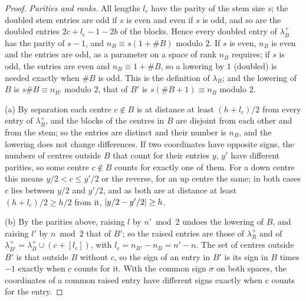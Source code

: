 \begin{proof}
\emph{Parities and ranks.} All lengths $l_c$ have the parity of the stem size $s$; the doubled stem entries are odd if $s$ is even and even if $s$ is odd, and so are the doubled entries $2c+l_c-1-2b$ of the blocks. Hence every doubled entry of $\lambda^+_B$ has the parity of $s-1$, and $n_B\equiv s(1+\#B)$ modulo $2$. If $s$ is even, $n_B$ is
even and the entries are odd, as a parameter on a space of rank $n_B$ requires; if $s$ is odd, the entries are even and $n_B\equiv1+\#B$, so a lowering by $1$ (doubled) is needed exactly when $\#B$ is odd. This is the definition of $\lambda_B$; and the lowering of $B$ is $s\#B\equiv n_{B'}$ modulo $2$, that of $B'$ is $s(\#B+1)\equiv n_B$
modulo $2$.

(a) By separation each centre $c\notin B$ is at distance at least $(h+l_c)/2$ from every entry of $\lambda^+_B$, and the blocks of the centres in $B$ are disjoint from each other and from the stem; so the entries are distinct and their number is $n_B$, and the lowering does not change differences. If two coordinates have opposite
signs, the numbers of centres outside $B$ that count for their entries $y$, $y'$ have different parities, so some centre $c\notin B$ counts for exactly one of them. For a down centre this means $y/2<c\le y'/2$ or the reverse, for an up centre the same; in both cases $c$ lies between $y/2$ and $y'/2$, and as both are at distance at least
$(h+l_c)/2\ge h/2$ from it, $\lvert y/2-y'/2\rvert\ge h$.

(b) By the parities above, raising $l$ by $n'\bmod2$ undoes the lowering of $B$, and raising $l'$ by $n\bmod2$ that of $B'$; so the raised entries are those of $\lambda^+_B$ and of $\lambda^+_{B'}=\lambda^+_B\cup(c+[l_c])$, with $l_c=n_{B'}-n_B=n'-n$. The set of centres outside $B'$ is that outside $B$ without $c$, so the sign of
an entry in $B'$ is its sign in $B$ times $-1$ exactly when $c$ counts for it. With the common sign $\sigma$ on both spaces, the coordinates of a common raised entry have different signs exactly when $c$ counts for the entry.


\end{proof}
